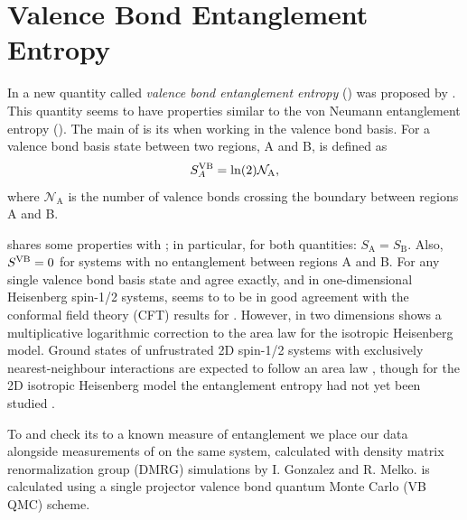 \chapter{Valence Bond Entanglement Entropy}

In  a new quantity called {\it{valence bond entanglement entropy}} (\vb) was proposed by .  
This quantity seems to have properties similar to the von Neumann entanglement entropy (\vn).
The main  of \vb is its  when working in the valence bond basis.
For a valence bond basis state \vb between two regions, A and B, is defined as 
\begin{equation}
S^{\text{VB}}_A = \ln({2})\mathcal{N}_{\text{A}},
\end{equation} 
where $\mathcal{N}_{\text{A}}$ is the number of valence bonds crossing the boundary between
regions A and B.


\vb shares some properties with \vn; in particular, for both quantities: $S_{\text{A}} = S_{\text{B}}$.
Also, $S^{\text{VB}} = 0$ for systems with no entanglement between regions A and B.
For any single valence bond basis state \vb and \vn agree exactly, and
in one-dimensional Heisenberg spin-1/2 systems, \vb seems to to be in good agreement with
the conformal field theory (CFT) results for \vn.
However, in two dimensions \vb shows a multiplicative logarithmic correction to the area law
for the isotropic Heisenberg model.  
Ground states of unfrustrated 2D spin-1/2 systems with exclusively nearest-neighbour interactions
are expected to follow an area law , though for the 2D isotropic Heisenberg model the entanglement entropy had not yet been studied .


To   and check its  to a known measure of entanglement we place our \vb data alongside measurements of \vn
on the same system, calculated with density matrix renormalization group (DMRG) simulations by I. Gonzalez and R. Melko.
\vb is calculated using a single projector valence bond quantum Monte Carlo (VB QMC) scheme.

